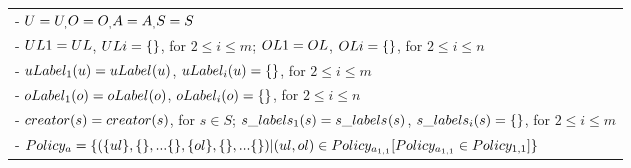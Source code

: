 \begin{table}
\begin{tabular}{|l|}
				- $U = U_\denom, O = O_\denom, A = A_\denom, S_{\suffixTwo} = S$ \\
				- $UL{1} = UL$, $UL{i} = \{\}$, for $2\le i \le m$; $OL{1} = OL$, $OL{i} = \{\}$, for $2\le i \le n$\\
				- $uLabel_{1}(u) = uLabel_{}(u)$, $uLabel_{i}(u) = \{\}$, for $2 \le i  \le m $\\
				- $oLabel_{1}(o) = oLabel_{}(o)$, $oLabel_{i}(o) = \{\}$, for $2 \le i  \le n $\\
				- $creator(s) = creator(s)$, for $s \in S$; $s\_labels_{1}(s) = s\_labels_{}(s)$, $s\_labels_{i}(s) = \{\}$, for $2 \le i \le m$\\
				- $Policy_a = \{( \{ul\}, \{\}, ...\{\}, \{ol\}, \{\}, ... \{\} ) | (ul,ol) \in Policy_{a_{1,1}}[ Policy_{a_{1,1}} \in Policy_{1,1}]\}$\\
		 \hline	
	\end{tabular}	

	
\end{table}
